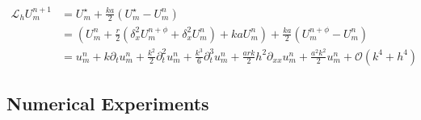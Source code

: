 \begin{align*}
  \mathcal{L}_h U_m^{n+1} & = U_m^\star + \tfrac{ka}{2} \left( U_m^\star - U_m^n \right)                                                                                                                                 \\
                          & = \left(U_m^n + \frac{r}{2} \left( \delta_x^2 U_m^{n+\phi} + \delta_x^2 U_m^n \right) + k a U_m^n\right) + \tfrac{ka}{2} \left( U_m^{n+\phi} - U_m^n \right)                                 \\
                          & = u_m^n + k\partial_t u_m^n + \tfrac{k^2}{2}\partial_t^2 u_m^n + \tfrac{k^3}{6}\partial_t^3 u_m^n + \tfrac{ark}{2}h^2\partial_{xx} u_m^n + \tfrac{a^2k^2}{2}u_m^n + \mathcal{O}(k^4+h^4)
\end{align*}

\subsection{\color{red} Numerical Experiments}